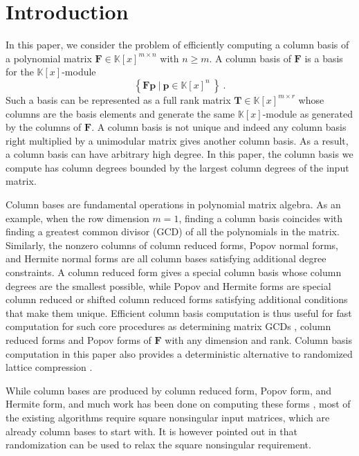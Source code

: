 
\section{\label{sec:Matrix-GCD}Introduction}

In this paper, we consider the problem of efficiently computing a
column basis of a polynomial matrix $\mathbf{F}\in\mathbb{K}\left[x\right]^{m\times n}$
with $n\ge m$. A column basis of $\mathbf{F}$ is a basis for the
$\mathbb{K}\left[x\right]$-module 
\[
\left\{ \mathbf{F}\mathbf{p}~|~\mathbf{p}\in\mathbb{K}\left[x\right]^{n}~\right\} ~.
\]
Such a basis can be represented as a full rank matrix $\mathbf{T}\in\mathbb{K}\left[x\right]^{m\times r}$
whose columns are the basis elements and generate the same $\mathbb{K}\left[x\right]$-module
as generated by the columns of $\mathbf{F}$. A column basis is not
unique and indeed any column basis right multiplied by a unimodular
matrix gives another column basis. As a result, a column basis can
have arbitrary high degree. In this paper, the column basis we compute
has column degrees bounded by the largest column degrees of the input
matrix.

Column bases are fundamental operations in polynomial matrix algebra.
As an example, when the row dimension $m=1$, finding a column basis
coincides with finding a greatest common divisor (GCD) of all the
polynomials in the matrix. Similarly, the nonzero columns of column
reduced forms, Popov normal forms, and Hermite normal forms are all
column bases satisfying additional degree constraints. A column reduced
form gives a special column basis whose column degrees are the smallest
possible, while Popov and Hermite forms are special column reduced
or shifted column reduced forms satisfying additional conditions that
make them unique. Efficient column basis computation is thus useful
for fast computation for such core procedures as determining matrix
GCDs \cite{BL2000}, column reduced forms \cite{BVP:1988} and Popov
forms \cite{villard96} of $\mathbf{F}$ with any dimension and rank.
Column basis computation in this paper also provides a deterministic
alternative to randomized lattice compression \cite{li:2006,storjohann-villard:2005}.

While column bases are produced by column reduced form, Popov form,
and Hermite form, and much work has been done on computing these forms
\cite{bcl:2006,beelen:1988,Giorgi2003,GSSV2012,sarkar2011,SS2011},
most of the existing algorithms require square nonsingular input matrices,
which are already column bases to start with. It is however pointed
out in \cite{sarkar2011,SS2011} that randomization can be used to
relax the square nonsingular requirement.

